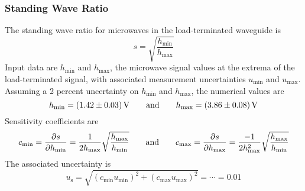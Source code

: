 \documentclass[11pt, a4paper]{article}
\newcommand{\eqtext}[1]{\qquad \text{#1} \qquad}
\begin{document}
\subsubsection{Standing Wave Ratio}
The standing wave ratio for microwaves in the load-terminated waveguide is
\begin{equation*}
	s = \sqrt{\frac{h_{\text{min}}}{h_{\text{max}}}} 
\end{equation*}
Input data are $ h_{\text{min}} $ and $ h_{\text{max}} $, the microwave signal values at the extrema of the load-terminated signal, with associated measurement uncertainties $ u_{\text{min}} $ and $ u_{\text{max}} $. Assuming a 2 percent uncertainty on $ h_{\text{min}} $ and $ h_{\text{max}} $, the numerical values are
\begin{equation*}
	h_{\text{min}} = \SI{1.42 \pm 0.03}{V} \eqtext{and} h_{\text{max}} = \SI{3.86 \pm 0.08}{V}
\end{equation*}
Sensitivity coefficients are
\begin{equation*}
	c_{\text{min}} = \pdv{s}{h_{\text{min}}} = \frac{1}{2h_{\text{max}}} \sqrt{\frac{h_{\text{max}}}{h_{\text{min}}}} \eqtext{and} 	c_{\text{max}} = \pdv{s}{h_{\text{max}}} = \frac{-1}{2h^{2}_{\text{max}}} \sqrt{\frac{h_{\text{max}}}{h_{\text{min}}}}
\end{equation*}
The associated uncertainty is
\begin{equation*}
	u_{\text{s}} = \sqrt{(c_{\text{min}}u_{\text{min}})^2 + (c_{\text{max}}u_{\text{max}})^2} = \cdots = 0.01
\end{equation*}
\end{document}
